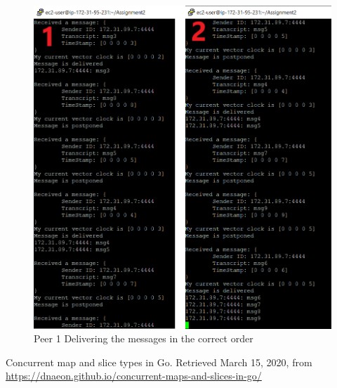 \documentclass[a4paper]{article}
\begin{document}
\begin{figure}[!htb]
\centering
\includegraphics[width=\textwidth]{msg_peer1.PNG}
\caption{{Peer 1 Delivering the messages in the correct order}}
\end{figure}



 \begin{thebibliography}{9}
Concurrent map and slice types in Go. Retrieved March 15, 2020, from \href{https://dnaeon.github.io/concurrent-maps-and-slices-in-go/}{https://dnaeon.github.io/concurrent-maps-and-slices-in-go/}
 \end{thebibliography}   
\end{document}
